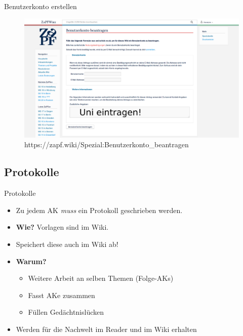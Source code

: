 \documentclass[compress,]{beamer}
\begin{document}
\begin{frame}{Benutzerkonto erstellen}
\begin{figure}
\centering
\includegraphics[scale=0.15]{ZaPFWiki_2.pdf}

\caption{https://zapf.wiki/Spezial:Benutzerkonto\_beantragen}
\end{figure}

\end{frame}



\subsection{Protokolle}

\begin{frame}{Protokolle}

  \begin{itemize}
  \item<1-> Zu jedem AK \emph{muss} ein Protokoll geschrieben werden.
  \item<2-> \textbf{Wie?} Vorlagen sind im Wiki.

  \item<3-> Speichert diese auch im Wiki ab!
  \item<3-> \textbf{Warum?}
    \begin{itemize}
    \item<4-> Weitere Arbeit an selben Themen (Folge-AKs)
    \item<5-> Fasst AKe zusammen
    \item<6-> Füllen Gedächtnislücken
    \end{itemize}
  \item<7-> Werden für die Nachwelt im Reader und im Wiki erhalten
  \end{itemize}

\end{frame}
\end{document}
